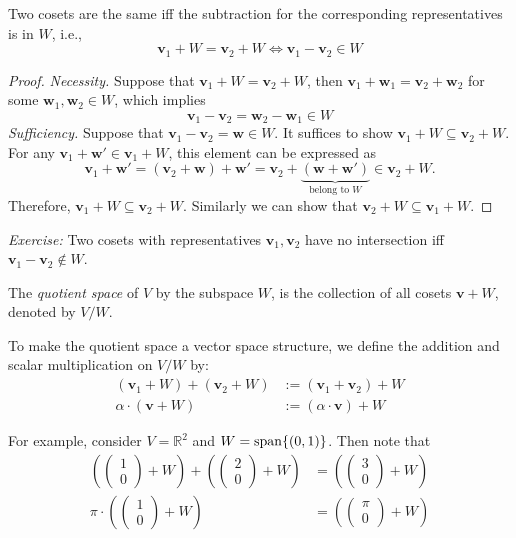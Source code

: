 \begin{proposition}\label{pro:4:1}
Two cosets are the same iff the subtraction for the corresponding representatives is in $W$, i.e., 
\[
\bm v_1+W=\bm v_2+W
\Longleftrightarrow
\bm v_1-\bm v_2\in W
\]
\end{proposition}
\begin{proof}
\textit{Necessity.}
Suppose that $\bm v_1+W=\bm v_2+W$, then $\bm v_1+\bm w_1=\bm v_2+\bm w_2$ for some $\bm w_1,\bm w_2\in W$, which implies
\[
\bm v_1-\bm v_2=\bm w_2-\bm w_1\in W
\]
\textit{Sufficiency.}
Suppose that $\bm v_1-\bm v_2=\bm w\in W$. It suffices to show $\bm v_1+W\subseteq\bm v_2+W$.
For any $\bm v_1+\bm w'\in \bm v_1+W$, this element can be expressed as
\[
\bm v_1+\bm w'=(\bm v_2+\bm w)+\bm w'=\bm v_2+\underbrace{(\bm w+\bm w')}_{\text{belong to $W$}}\in \bm v_2+W.
\]
Therefore, $\bm v_1+W\subseteq \bm v_2+W$. Similarly we can show that $\bm v_2+W\subseteq \bm v_1+W$.
\end{proof}
\textit{Exercise: }Two cosets with representatives $\bm v_1,\bm v_2$ have no intersection iff $\bm v_1-\bm v_2\notin W$.

\begin{definition}
The \emph{quotient space} of $V$ by the subspace $W$, is the collection of all cosets $\bm v+W$, denoted by $V/ W$.
\end{definition}
To make the quotient space a vector space structure, we define the addition and scalar multiplication on $V/ W$ by:
\begin{align*}
(\bm v_1+W)+(\bm v_2+W)&:=(\bm v_1+\bm v_2)+W\\
\alpha\cdot (\bm v+W)&:=(\alpha\cdot\bm v) + W
\end{align*}

For example, consider $V=\mathbb{R}^2$ and $W=\operatorname{span}\{(0,1)\}$. Then note that
\begin{align*}
\left(
\begin{pmatrix}
1\\0
\end{pmatrix}+W
\right)
+
\left(
\begin{pmatrix}
2\\0
\end{pmatrix}+W
\right)
&=
\left(
\begin{pmatrix}
3\\0
\end{pmatrix}+W
\right)\\
\pi\cdot\left(
\begin{pmatrix}
1\\0
\end{pmatrix}+W
\right)
&=
\left(
\begin{pmatrix}
\pi\\0
\end{pmatrix}+W
\right)
\end{align*}


